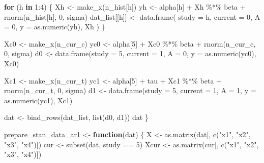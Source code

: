 \documentclass[
  letterpaper,
  DIV=11,
  numbers=noendperiod]{scrartcl}
\newenvironment{Shaded}{\begin{snugshade}}{\end{snugshade}}
\newcommand{\AttributeTok}[1]{\textcolor[rgb]{0.40,0.45,0.13}{#1}}
\newcommand{\ControlFlowTok}[1]{\textcolor[rgb]{0.00,0.23,0.31}{\textbf{#1}}}
\newcommand{\DecValTok}[1]{\textcolor[rgb]{0.68,0.00,0.00}{#1}}
\newcommand{\FunctionTok}[1]{\textcolor[rgb]{0.28,0.35,0.67}{#1}}
\newcommand{\NormalTok}[1]{\textcolor[rgb]{0.00,0.23,0.31}{#1}}
\newcommand{\OtherTok}[1]{\textcolor[rgb]{0.00,0.23,0.31}{#1}}
\newcommand{\SpecialCharTok}[1]{\textcolor[rgb]{0.37,0.37,0.37}{#1}}
\newcommand{\StringTok}[1]{\textcolor[rgb]{0.13,0.47,0.30}{#1}}
\begin{document}
\begin{Shaded}
\begin{Highlighting}[]
  \ControlFlowTok{for}\NormalTok{ (h }\ControlFlowTok{in} \DecValTok{1}\SpecialCharTok{:}\DecValTok{4}\NormalTok{) \{}
\NormalTok{    Xh }\OtherTok{\textless{}{-}} \FunctionTok{make\_x}\NormalTok{(n\_hist[h])}
\NormalTok{    yh }\OtherTok{\textless{}{-}}\NormalTok{ alpha[h] }\SpecialCharTok{+}\NormalTok{ Xh }\SpecialCharTok{\%*\%}\NormalTok{ beta }\SpecialCharTok{+} \FunctionTok{rnorm}\NormalTok{(n\_hist[h], }\DecValTok{0}\NormalTok{, sigma)}
\NormalTok{    dat\_list[[h]] }\OtherTok{\textless{}{-}} \FunctionTok{data.frame}\NormalTok{(}
      \AttributeTok{study =}\NormalTok{ h,}
      \AttributeTok{current =} \DecValTok{0}\NormalTok{,}
      \AttributeTok{A =} \DecValTok{0}\NormalTok{,}
      \AttributeTok{y =} \FunctionTok{as.numeric}\NormalTok{(yh),}
\NormalTok{      Xh}
\NormalTok{    )}
\NormalTok{  \}}

\NormalTok{  Xc0 }\OtherTok{\textless{}{-}} \FunctionTok{make\_x}\NormalTok{(n\_cur\_c)}
\NormalTok{  yc0 }\OtherTok{\textless{}{-}}\NormalTok{ alpha[}\DecValTok{5}\NormalTok{] }\SpecialCharTok{+}\NormalTok{ Xc0 }\SpecialCharTok{\%*\%}\NormalTok{ beta }\SpecialCharTok{+} \FunctionTok{rnorm}\NormalTok{(n\_cur\_c, }\DecValTok{0}\NormalTok{, sigma)}
\NormalTok{  d0 }\OtherTok{\textless{}{-}} \FunctionTok{data.frame}\NormalTok{(}\AttributeTok{study =} \DecValTok{5}\NormalTok{, }\AttributeTok{current =} \DecValTok{1}\NormalTok{, }\AttributeTok{A =} \DecValTok{0}\NormalTok{, }\AttributeTok{y =} \FunctionTok{as.numeric}\NormalTok{(yc0), Xc0)}

\NormalTok{  Xc1 }\OtherTok{\textless{}{-}} \FunctionTok{make\_x}\NormalTok{(n\_cur\_t)}
\NormalTok{  yc1 }\OtherTok{\textless{}{-}}\NormalTok{ alpha[}\DecValTok{5}\NormalTok{] }\SpecialCharTok{+}\NormalTok{ tau }\SpecialCharTok{+}\NormalTok{ Xc1 }\SpecialCharTok{\%*\%}\NormalTok{ beta }\SpecialCharTok{+} \FunctionTok{rnorm}\NormalTok{(n\_cur\_t, }\DecValTok{0}\NormalTok{, sigma)}
\NormalTok{  d1 }\OtherTok{\textless{}{-}} \FunctionTok{data.frame}\NormalTok{(}\AttributeTok{study =} \DecValTok{5}\NormalTok{, }\AttributeTok{current =} \DecValTok{1}\NormalTok{, }\AttributeTok{A =} \DecValTok{1}\NormalTok{, }\AttributeTok{y =} \FunctionTok{as.numeric}\NormalTok{(yc1), Xc1)}

\NormalTok{  dat }\OtherTok{\textless{}{-}} \FunctionTok{bind\_rows}\NormalTok{(dat\_list, }\FunctionTok{list}\NormalTok{(d0, d1))}
\NormalTok{  dat}
\NormalTok{\}}

\NormalTok{prepare\_stan\_data\_ar1 }\OtherTok{\textless{}{-}} \ControlFlowTok{function}\NormalTok{(dat) \{}
\NormalTok{  X }\OtherTok{\textless{}{-}} \FunctionTok{as.matrix}\NormalTok{(dat[, }\FunctionTok{c}\NormalTok{(}\StringTok{"x1"}\NormalTok{, }\StringTok{"x2"}\NormalTok{, }\StringTok{"x3"}\NormalTok{, }\StringTok{"x4"}\NormalTok{)])}
\NormalTok{  cur }\OtherTok{\textless{}{-}} \FunctionTok{subset}\NormalTok{(dat, study }\SpecialCharTok{==} \DecValTok{5}\NormalTok{)}
\NormalTok{  Xcur }\OtherTok{\textless{}{-}} \FunctionTok{as.matrix}\NormalTok{(cur[, }\FunctionTok{c}\NormalTok{(}\StringTok{"x1"}\NormalTok{, }\StringTok{"x2"}\NormalTok{, }\StringTok{"x3"}\NormalTok{, }\StringTok{"x4"}\NormalTok{)])}


\end{Highlighting}
\end{Shaded}
\end{document}
